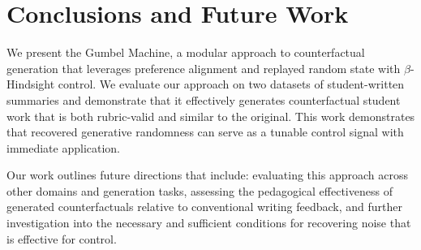\documentclass[letterpaper]{article} %
\newcommand{\mh}[1]{\textcolor{teal}{\bf [Hunter: #1]}}
\newcommand{\al}[1]{\textcolor{blue}{\bf [Alex: #1]}}
\begin{document}




\section{Conclusions and Future Work}
We present the Gumbel Machine, a modular approach to counterfactual generation that leverages preference alignment and replayed random state with $\beta$-Hindsight control.
We evaluate our approach on two datasets of student-written summaries and demonstrate that it effectively generates counterfactual student work that is both rubric-valid and similar to the original. This work demonstrates that recovered generative randomness can serve as a tunable control signal with immediate application.

Our work outlines future directions that include: evaluating this approach across other domains and generation tasks, assessing the pedagogical effectiveness of generated counterfactuals relative to conventional writing feedback, and further investigation into the necessary and sufficient conditions for recovering noise that is effective for control.


\clearpage

%
{\small

}
\end{document}
